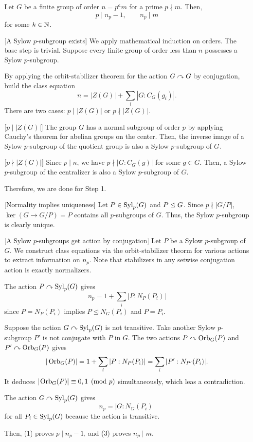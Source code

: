 \documentclass{../exp}
\begin{document}
\begin{thm}[Sylow]
Let $G$ be a finite group of order $n=p^am$ for a prime $p\nmid m$.
Then,
\[p\mid n_p-1,\qquad n_p\mid m\]
for some $k\in\mathbb{N}$.
\end{thm}
\begin{pf}
[A Sylow $p$-subgroup exists]
We apply mathematical induction on orders.
The base step is trivial.
Suppose every finite group of order less than $n$ possesses a Sylow $p$-subgroup.

By applying the orbit-stabilizer theorem for the action $G\curvearrowright G$ by conjugation, build the class equation
\[n=|Z(G)|+\sum_i|G:C_G(g_i)|.\]
There are two cases: $p\mid|Z(G)|$ or $p\nmid|Z(G)|$.

[$p\mid|Z(G)|$]
The group $G$ has a normal subgroup of order $p$ by applying Cauchy's theorem for abelian groups on the center.
Then, the inverse image of a Sylow $p$-subgroup of the quotient group is also a Sylow $p$-subgroup of $G$.

[$p\nmid|Z(G)|$]
Since $p\mid n$, we have $p\nmid|G:C_G(g)|$ for some $g\in G$.
Then, a Sylow $p$-subgroup of the centralizer is also a Sylow $p$-subgroup of $G$.

Therefore, we are done for Step 1.

\bigskip
{}[Normality implies uniqueness]
Let $P\in\operatorname{Syl}_p(G)$ and $P\trianglelefteq G$.
Since $p\nmid|G/P|$, $\ker(G\to G/P)=P$ contains all $p$-subgroups of $G$.
Thus, the Sylow $p$-subgroup is clearly unique.

\bigskip
{}[A Sylow $p$-subgroups get action by conjugation]
Let $P$ be a Sylow $p$-subgroup of $G$.
We construct class equations via the orbit-stabilizer theorm for various actions to extract information on $n_p$.
Note that stabilizers in any setwise conjugation action is exactly normalizers.
\begin{cond}
\item The action $P\curvearrowright\operatorname{Syl}_p(G)$ gives
\[n_p=1+\sum_i|P:N_P(P_i)|\]
since $P=N_P(P_i)$ implies $P\trianglelefteq N_G(P_i)$ and $P=P_i$.
\item Suppose the action $G\curvearrowright\operatorname{Syl}_p(G)$ is not transitive.
Take another Sylow $p$-subgroup $P'$ is not conjugate with $P$ in $G$.
The two actions $P\curvearrowright\operatorname{Orb}_G(P)$ and $P'\curvearrowright\operatorname{Orb}_G(P)$ gives
\[|\operatorname{Orb}_G(P)|=1+\sum_i|P:N_P(P_i)|=\sum_i|P':N_{P'}(P_i)|.\]
It deduces $|\operatorname{Orb}_G(P)|\equiv0,1\pmod{p}$ simultaneously, which leas a contradiction.
\item The action $G\curvearrowright\operatorname{Syl}_p(G)$ gives
\[n_p=|G:N_G(P_i)|\]
for all $P_i\in\operatorname{Syl}_p(G)$ because the action is transitive.
\end{cond}
Then, (1) proves $p\mid n_p-1$, and (3) proves $n_p\mid m$.
\end{pf}
\end{document}

